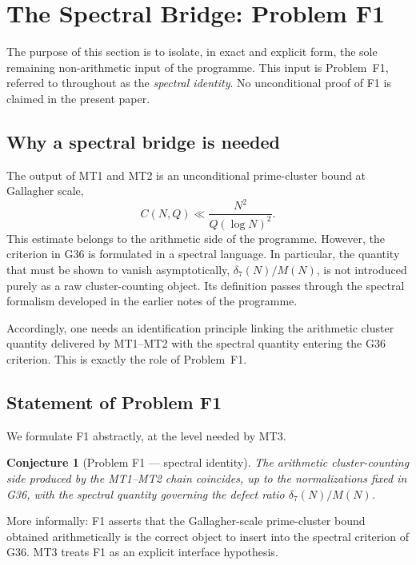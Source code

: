 \documentclass[11pt,a4paper]{article}
\newtheorem{conjecture}[theorem]{Conjecture}
\begin{document}
\section{The Spectral Bridge: Problem F1}

The purpose of this section is to isolate, in exact and explicit form, the sole remaining non-arithmetic input of the programme. This input is Problem~F1, referred to throughout as the \emph{spectral identity}. No unconditional proof of F1 is claimed in the present paper.

\subsection{Why a spectral bridge is needed}

The output of MT1 and MT2 is an unconditional prime-cluster bound at Gallagher scale,
\[
C(N,Q) \ll \frac{N^2}{Q(\log N)^2}.
\]
This estimate belongs to the arithmetic side of the programme. However, the criterion in G36 is formulated in a spectral language. In particular, the quantity that must be shown to vanish asymptotically, $\delta_7(N)/M(N)$, is not introduced purely as a raw cluster-counting object. Its definition passes through the spectral formalism developed in the earlier notes of the programme.

Accordingly, one needs an identification principle linking the arithmetic cluster quantity delivered by MT1--MT2 with the spectral quantity entering the G36 criterion. This is exactly the role of Problem~F1.

\subsection{Statement of Problem F1}

We formulate F1 abstractly, at the level needed by MT3.

\begin{conjecture}[Problem F1 --- spectral identity]
\label{conj:F1}
The arithmetic cluster-counting side produced by the MT1--MT2 chain coincides, up to the normalizations fixed in G36, with the spectral quantity governing the defect ratio $\delta_7(N)/M(N)$.
\end{conjecture}

More informally: F1 asserts that the Gallagher-scale prime-cluster bound obtained arithmetically is the correct object to insert into the spectral criterion of G36. MT3 treats F1 as an explicit interface hypothesis.
\end{document}
